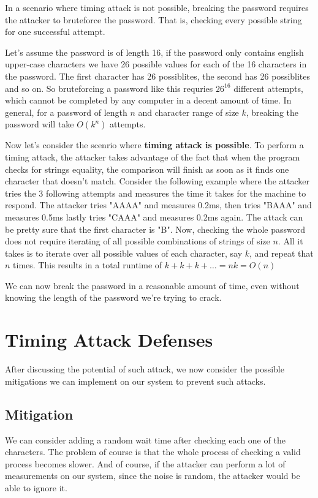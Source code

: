 In a scenario where timing attack is not possible, breaking the password requires the attacker
 to bruteforce the password.
 That is, checking every possible string for one successful attempt.

Let's assume the password is of length 16, if the password only contains english upper-case characters we have 26 possible values for each of the 16 characters in the password.
The first character has 26 possiblites, the second has 26 possiblites and so on. 
So bruteforcing a password like this requries ${26}^{16}$ different attempts, which cannot be completed by any computer in a decent amount of time.
In general, for a password of length $n$ and character range of size $k$,
 breaking the password will take $O({k}^{n})$ attempts.

Now let's consider the scenrio where \textbf{timing attack is possible}. To perform a timing attack,
the attacker takes advantage of the fact that when the program checks for strings equality, the comparison will finish as soon as it finds one character that doesn't match.
Consider the following example where the attacker tries the 3 following attempts and measures
the time it takes for the machine to respond. The attacker tries "AAAA" and measures 0.2ms, then tries "BAAA" and measures 0.5ms lastly tries "CAAA" and measures 0.2ms again.
The attack can be pretty sure that the first character is "B".
Now, checking the whole password does not require iterating of all possible combinations of strings of size $n$. 
All it takes is to iterate over all possible values of each character, say $k$, and repeat that $n$ times.
This results in a total runtime of $k+k+k+\dots = nk = O(n)$

We can now break the password in a reasonable amount of time, even without knowing the 
length of the password we're trying to crack.

\section{Timing Attack Defenses}
After discussing the potential of such attack, we now consider the possible mitigations we can 
implement on our system to prevent such attacks.

\subsection{Mitigation}
We can consider adding a random wait time after checking each one of the characters.
The problem of course is that the whole process of checking a valid process becomes slower.
And of course, if the attacker can perform a lot of measurements on our system, since the noise is random, the attacker would be able to ignore it.


